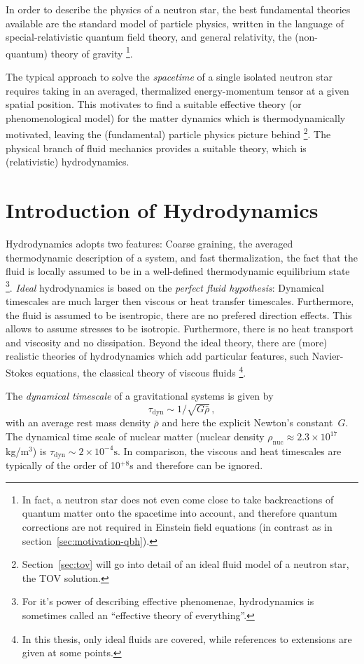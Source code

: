 In order to describe the physics of a neutron star, the best fundamental
theories available are the standard model of particle physics, written in the
language of special-relativistic quantum field theory, and general relativity,
the (non-quantum) theory of gravity \footnote{In fact, a neutron star does not 
even come close to take backreactions of quantum matter onto the spacetime into
account, and therefore quantum corrections are not required in Einstein field
equations (in contrast as in section~\ref{sec:motivation-qbh}).}.

The typical approach to solve the \emph{spacetime} of a single isolated
neutron star requires taking in an averaged, thermalized
energy-momentum tensor at a given spatial position. This motivates to find a
suitable effective theory (or phenomenological model) for the matter dynamics
which is thermodynamically motivated, leaving the (fundamental) particle
physics picture behind \footnote{Section~\vref{sec:tov} will go into detail of
an ideal fluid model of a neutron star, the TOV solution.}. The physical branch
of fluid mechanics provides a suitable theory, which is (relativistic)
hydrodynamics. 

\section{Introduction of Hydrodynamics}
Hydrodynamics adopts two features: Coarse graining, \ie the averaged 
thermodynamic description
of a system, and fast thermalization, \ie the fact that the fluid is locally
assumed to be in a well-defined thermodynamic equilibrium state
\footnote{
 For it's power of describing effective phenomenae, hydrodynamics is sometimes
 called an ``effective theory of everything''.
}.
\emph{Ideal} hydrodynamics is based on the \emph{perfect fluid hypothesis}: 
Dynamical timescales are much larger then viscous or heat transfer timescales. 
Furthermore, the fluid is assumed to be isentropic, \ie there are no prefered 
direction effects. This allows to assume stresses to be isotropic. Furthermore,
there is no heat transport and viscosity and no dissipation. Beyond the ideal
theory, there are (more) realistic theories of hydrodynamics which add
particular features, such Navier-Stokes equations, the classical theory of
viscous fluids \footnote{In this thesis, only ideal fluids are covered, while
 references to extensions are given at some points.}.

The \emph{dynamical timescale} of a gravitational systems is given by
\cite{Rezzolla_book:2013}
\begin{equation}
\tau_\text{dyn} \sim 1/\sqrt{G\bar\rho} \,,
\end{equation}
with an average rest mass density $\bar \rho$ and here the explicit Newton's
constant~$G$. The dynamical time scale of nuclear
matter (nuclear density $\rho_\text{nuc} \approx 2.3\times 10^{17}$kg/m$^3$)
is $\tau_\text{dyn} \sim 2 \times 10^{-4}\text{s}$.
In comparison, the viscous and heat timescales
are typically of the order of 10$^{+8}$s and therefore can be ignored.

